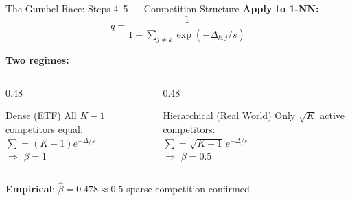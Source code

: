 \documentclass[aspectratio=169,14pt]{beamer}
\begin{document}
\begin{frame}{The Gumbel Race: Steps 4--5 --- Competition Structure}
\textbf{Apply to 1-NN:}
\[
q = \frac{1}{1 + \sum_{j \neq k} \exp(-\Delta_{k,j}/s)}
\]

\vspace{0.3cm}
\textbf{Two regimes:}

\begin{columns}[T]
\begin{column}{0.48\textwidth}
\begin{block}{Dense (ETF)}
All $K{-}1$ competitors equal:\\
$\sum = (K{-}1)e^{-\Delta/s}$\\
$\Rightarrow$ $\beta = 1$
\end{block}
\end{column}
\begin{column}{0.48\textwidth}
\begin{exampleblock}{Hierarchical (Real World)}
Only $\sqrt{K}$ active competitors:\\
$\sum = \sqrt{K{-}1}\,e^{-\Delta/s}$\\
$\Rightarrow$ $\beta = 0.5$
\end{exampleblock}
\end{column}
\end{columns}

\vspace{0.3cm}
\textbf{Empirical}: $\hat\beta = 0.478 \approx 0.5$ \textcolor{ctigreen}{\checkmark} sparse competition confirmed
\end{frame}
\end{document}
